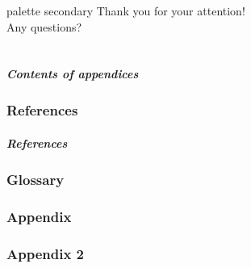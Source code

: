 \documentclass[%
aspectratio=169,%
xcolor=table,%
]{beamer}
\begin{document}
 
    \begin{frame}
        [%
            endframe,
            t,%
        ]%
        \centering\inserttitlegraphic\par
        \vfill
        \begin{beamercolorbox}[sep=4pt,center,rounded=true,shadow=true]{palette secondary}
            Thank you for your attention!\\
            Any questions?
        \end{beamercolorbox}
    \end{frame}


    \backupbegin

    \part{}
    \begin{frame}
        \frametitle{Contents of appendices}
        \tableofcontents
    \end{frame}

    \section{References}
    \begin{frame}[allowframebreaks]
        \frametitle{References}
        \printbibliography
    \end{frame}

    \section{Glossary}
    
    \section{Appendix}
    
    \section{Appendix 2}
    

    \backupend
 
\end{document}
